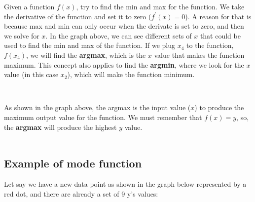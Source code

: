 Given a function $f(x)$, try to find the min and max for the function.
We take the derivative of the function and set it to zero ($f^{\prime}(x) = 0$).
A reason for that is because max and min can only occur when the derivate is set to zero, and
then we solve for $x$. In the graph above, we can see different sets of $x$ that could 
be used to find the min and max of the function. If we plug $x_4$ to the function, $f(x_4)$,
we will find the \textbf{argmax}, which is the $x$ value that makes the function maximum. This concept
also applies to find the \textbf{argmin}, where we look for the $x$ value (in this case $x_2$), which will make
the function minimum.\\


\begin{center}
     \\
\end{center}

As shown in the graph above, the argmax is the input value ($x$) to produce the maximum
output value for the function. We must remember that $f(x) = y$, so, the \textbf{argmax}
will produce the highest $y$ value.\\\\


\subsection{Example of mode function}

Let say we have a new data point as shown in the graph below represented by a red dot, and there
are already a set of 9 y's values:

